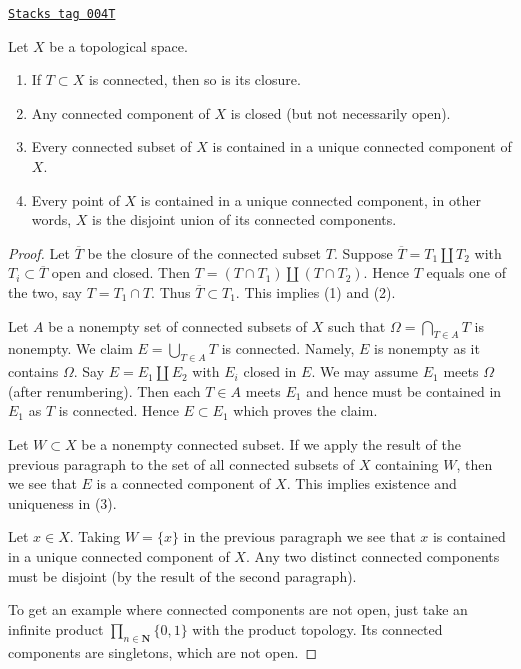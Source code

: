 \begin{lemma}
\label{topology-lemma-connected-components}
\href{https://stacks.math.columbia.edu/tag/004T}{\texttt{Stacks tag 004T}}

Let $X$ be a topological space.
\begin{enumerate}
\item If $T \subset X$ is connected, then so is its closure.
\item Any connected component of $X$ is closed (but not necessarily open).
\item Every connected subset of $X$ is contained in a unique connected
component of $X$.
\item Every point of $X$ is contained in a unique connected component, in other
words, $X$ is the disjoint union of its connected components.
\end{enumerate}
\end{lemma}

\begin{proof}
Let $\overline{T}$ be the closure of the connected subset $T$.
Suppose $\overline{T} = T_1 \amalg T_2$ with $T_i \subset \overline{T}$
open and closed. Then $T = (T\cap T_1) \amalg (T \cap T_2)$. Hence
$T$ equals one of the two, say $T = T_1 \cap T$. Thus
$\overline{T} \subset T_1$. This implies (1) and (2).

\medskip\noindent
Let $A$ be a nonempty set of connected subsets of $X$ such that
$\Omega = \bigcap_{T \in A} T$ is nonempty. We claim $E = \bigcup_{T \in A} T$
is connected. Namely, $E$ is nonempty as it contains $\Omega$.
Say $E = E_1 \amalg E_2$ with $E_i$ closed in $E$. We may assume
$E_1$ meets $\Omega$ (after renumbering). Then each $T \in A$ meets $E_1$
and hence must be contained in $E_1$ as $T$ is connected. Hence $E \subset E_1$
which proves the claim.

\medskip\noindent
Let $W \subset X$ be a nonempty connected subset.
If we apply the result of the previous paragraph to the set of all
connected subsets of $X$ containing $W$, then we see that $E$ is
a connected component of $X$. This implies existence and uniqueness in (3).

\medskip\noindent
Let $x \in X$. Taking $W = \{x\}$ in the previous paragraph
we see that $x$ is contained in a unique connected component of $X$.
Any two distinct connected components must be disjoint (by the
result of the second paragraph).

\medskip\noindent
To get an example where connected components are not open, just take
an infinite product $\prod_{n \in \mathbf{N}} \{0, 1\}$
with the product topology. Its connected components are singletons,
which are not open.
\end{proof}

